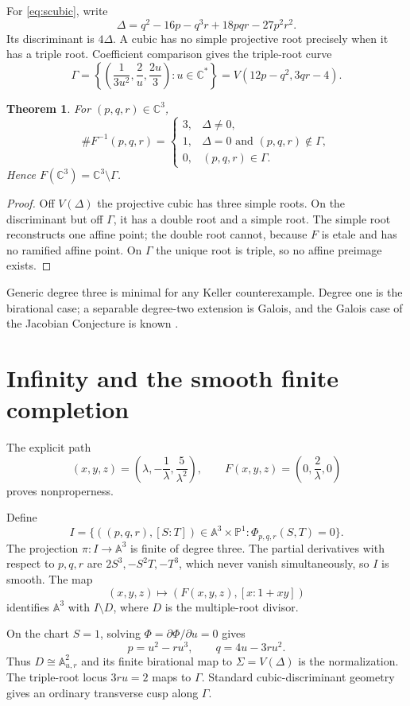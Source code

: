 \documentclass[11pt]{article}
\newtheorem{theorem}{Theorem}[section]
\theoremstyle{remark}
\newcommand{\A}{\mathbb A}
\newcommand{\C}{\mathbb C}
\begin{document}
For \eqref{eq:scubic}, write
\[
\Delta=q^2-16p-q^3r+18pqr-27p^2r^2.
\]
Its discriminant is $4\Delta$. A cubic has no simple projective root precisely
when it has a triple root. Coefficient comparison gives the triple-root curve
\[
\Gamma=\left\{\left(\frac1{3u^2},\frac2u,\frac{2u}3\right):u\in\C^*\right\}
=V(12p-q^2,3qr-4).
\]

\begin{theorem}\label{thm:fibers}
For $(p,q,r)\in\C^3$,
\[
\#F^{-1}(p,q,r)=
\begin{cases}
3,&\Delta\neq0,\\
1,&\Delta=0\text{ and }(p,q,r)\notin\Gamma,\\
0,&(p,q,r)\in\Gamma.
\end{cases}
\]
Hence $F(\C^3)=\C^3\setminus\Gamma$.
\end{theorem}

\begin{proof}
Off $V(\Delta)$ the projective cubic has three simple roots. On the
discriminant but off $\Gamma$, it has a double root and a simple root. The
simple root reconstructs one affine point; the double root cannot, because
$F$ is etale and has no ramified affine point. On $\Gamma$ the unique root is
triple, so no affine preimage exists.
\end{proof}

Generic degree three is minimal for any Keller counterexample. Degree one is
the birational case; a separable degree-two extension is Galois, and the
Galois case of the Jacobian Conjecture is known
\cite{campbell,razar,wright1981}.

\section{Infinity and the smooth finite completion}

The explicit path
\[
(x,y,z)=\left(\lambda,-\frac1\lambda,\frac5{\lambda^2}\right),
\qquad F(x,y,z)=\left(0,\frac2\lambda,0\right)
\]
proves nonproperness.

Define
\[
I=\{((p,q,r),[S:T])\in\A^3\times\mathbb P^1:\Phi_{p,q,r}(S,T)=0\}.
\]
The projection $\pi:I\to\A^3$ is finite of degree three. The partial
derivatives with respect to $p,q,r$ are $2S^3,-S^2T,-T^3$, which never vanish
simultaneously, so $I$ is smooth. The map
\[
(x,y,z)\longmapsto(F(x,y,z),[x:1+xy])
\]
identifies $\A^3$ with $I\setminus D$, where $D$ is the multiple-root divisor.

On the chart $S=1$, solving $\Phi=\partial\Phi/\partial u=0$ gives
\[
p=u^2-ru^3,\qquad q=4u-3ru^2.
\]
Thus $D\cong\A^2_{u,r}$ and its finite birational map to
$\Sigma=V(\Delta)$ is the normalization. The triple-root locus $3ru=2$ maps
to $\Gamma$. Standard cubic-discriminant geometry gives an ordinary transverse
cusp along $\Gamma$.
\end{document}
